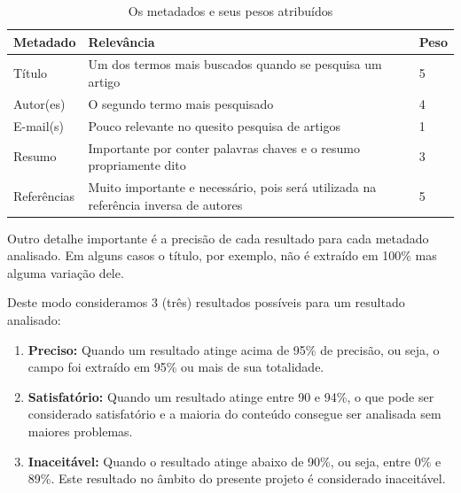 \documentclass[
	12pt,               %
	openright,          %
	twoside,            %
	a4paper,            %
	english,            %
	brazil              %
	]{abntex2}
\begin{document}
\begin{table}
    \caption{Os metadados e seus pesos atribuídos}
    \begin{center}
    	\begin{tabular}{|p{3cm}|p{8cm}|C{1cm}|}
			\hline \textbf{Metadado} & \textbf{Relevância} & \textbf{Peso} \\ 
			\hline Título & Um dos termos mais buscados quando se pesquisa um artigo & 5 \\
	    	\hline Autor(es) & O segundo termo mais pesquisado & 4 \\
	    	\hline E-mail(s) & Pouco relevante no quesito pesquisa de artigos & 1 \\
	    	\hline Resumo & Importante por conter palavras chaves e o resumo propriamente dito & 3 \\
	    	\hline Referências & Muito importante e necessário, pois será utilizada na referência inversa de autores & 5 \\
	    	\hline 
    	\end{tabular} 
    \end{center}
  	\label{tab:pesos}
\end{table}


Outro detalhe importante é a precisão de cada resultado para cada metadado analisado. Em alguns casos o título, por exemplo, não é extraído em 100\% mas alguma variação dele. 

Deste modo consideramos 3 (três) resultados possíveis para um resultado analisado:

\begin{enumerate}
\item \textbf{Preciso:} Quando um resultado atinge acima de 95\% de precisão, ou seja, o campo foi extraído em 95\% ou mais de sua totalidade.
\item \textbf{Satisfatório:} Quando um resultado atinge entre 90 e 94\%, o que pode ser considerado satisfatório e a maioria do conteúdo consegue ser analisada sem maiores problemas.
\item \textbf{Inaceitável:} Quando o resultado atinge abaixo de 90\%, ou seja, entre 0\% e 89\%. Este resultado no âmbito do presente projeto é considerado inaceitável.
\end{enumerate}
\end{document}
